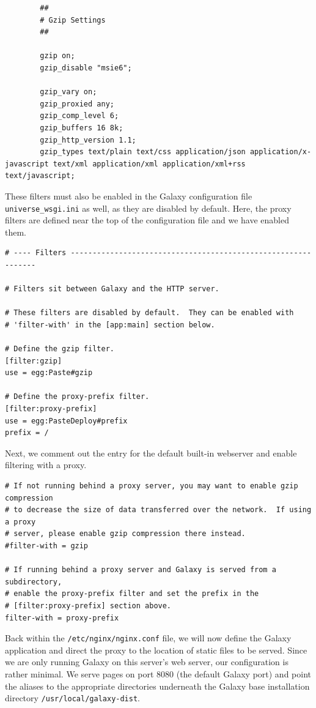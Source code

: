\documentclass[a4paper,10pt]{article}
\begin{document}
\begin{lstlisting}
        ##
        # Gzip Settings
        ##

        gzip on;
        gzip_disable "msie6";

        gzip_vary on;
        gzip_proxied any;
        gzip_comp_level 6;
        gzip_buffers 16 8k;
        gzip_http_version 1.1;
        gzip_types text/plain text/css application/json application/x-javascript text/xml application/xml application/xml+rss text/javascript;
\end{lstlisting}

These filters must also be enabled in the Galaxy configuration file \texttt{\footnotesize{universe\_wsgi.ini}} as well, as they are disabled by default.  Here, the proxy filters are defined near the top of the configuration file and we have enabled them.
\pagebreak
\begin{lstlisting}
# ---- Filters --------------------------------------------------------------

# Filters sit between Galaxy and the HTTP server.

# These filters are disabled by default.  They can be enabled with
# 'filter-with' in the [app:main] section below.

# Define the gzip filter.
[filter:gzip]
use = egg:Paste#gzip

# Define the proxy-prefix filter.
[filter:proxy-prefix]
use = egg:PasteDeploy#prefix
prefix = /
\end{lstlisting}

Next, we comment out the entry for the default built-in webserver and enable filtering with a proxy.

\begin{lstlisting}
# If not running behind a proxy server, you may want to enable gzip compression
# to decrease the size of data transferred over the network.  If using a proxy
# server, please enable gzip compression there instead.
#filter-with = gzip

# If running behind a proxy server and Galaxy is served from a subdirectory,
# enable the proxy-prefix filter and set the prefix in the
# [filter:proxy-prefix] section above.
filter-with = proxy-prefix
\end{lstlisting}

Back within the \texttt{\footnotesize{/etc/nginx/nginx.conf}} file, we will now define the Galaxy application and direct the proxy to the location of static files to be served.
Since we are only running Galaxy on this server's web server, our configuration is rather minimal.  We serve pages on port 8080 (the default Galaxy port) and point the aliases to the appropriate directories underneath the Galaxy base installation directory \texttt{\footnotesize{/usr/local/galaxy-dist}}.
\end{document}
